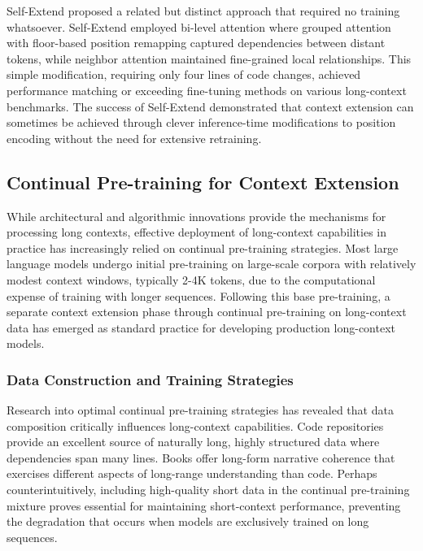 Self-Extend \citep{jin2024llm} proposed a related but distinct approach that required no training whatsoever. Self-Extend employed bi-level attention where grouped attention with floor-based position remapping captured dependencies between distant tokens, while neighbor attention maintained fine-grained local relationships. This simple modification, requiring only four lines of code changes, achieved performance matching or exceeding fine-tuning methods on various long-context benchmarks. The success of Self-Extend demonstrated that context extension can sometimes be achieved through clever inference-time modifications to position encoding without the need for extensive retraining.

\subsection{Continual Pre-training for Context Extension}

While architectural and algorithmic innovations provide the mechanisms for processing long contexts, effective deployment of long-context capabilities in practice has increasingly relied on continual pre-training strategies. Most large language models undergo initial pre-training on large-scale corpora with relatively modest context windows, typically 2-4K tokens, due to the computational expense of training with longer sequences. Following this base pre-training, a separate context extension phase through continual pre-training on long-context data has emerged as standard practice for developing production long-context models.

\subsubsection{Data Construction and Training Strategies}

Research into optimal continual pre-training strategies has revealed that data composition critically influences long-context capabilities. Code repositories provide an excellent source of naturally long, highly structured data where dependencies span many lines. Books offer long-form narrative coherence that exercises different aspects of long-range understanding than code. Perhaps counterintuitively, including high-quality short data in the continual pre-training mixture proves essential for maintaining short-context performance, preventing the degradation that occurs when models are exclusively trained on long sequences.

